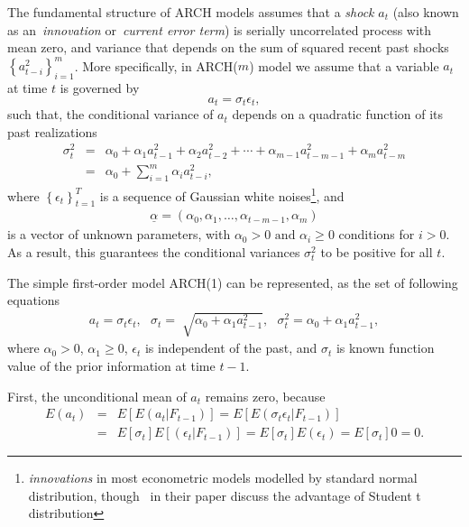 \documentclass[a4paper,11pt,english]{article}
\begin{document}
			The fundamental structure of ARCH models assumes that a \emph{shock} $a_t$ (also known as an~\emph{innovation} or~\emph{current error term}) is 
			serially uncorrelated process with mean zero, and variance that depends on the sum of squared recent past 
			shocks~$\left\{a^2_{t-i} \right\}^m_{i=1}$. More specifically, in ARCH($m$) model we assume that a variable $a_t$ at time $t$ is governed by
			\begin{equation*}
				a_t = \sigma_t \epsilon_t,
			\end{equation*}
			such that, the conditional variance of $a_t$ depends on a quadratic function of its past realizations 
			\begin{eqnarray} \label{eq:quadratic}
				\sigma_t^2 &=&  \alpha_0 + \alpha_1 a^2_{t-1} + \alpha_2 a^2_{t-2} + \cdots + \alpha_{m-1} a^2_{t-m-1}  + \alpha_m a^2_{t-m}  \\
						 &=& \alpha_0 + \sum_{i=1}^{m} \alpha_i a^2_{t-i},
			\end{eqnarray}								
			where $\left\{\epsilon_t \right\}_{t=1}^T$ is a sequence of Gaussian white noises\footnote{\emph{innovations} in most 
			econometric models modelled by standard normal distribution, though~\citep{hamiltonsusmel} in their paper discuss the advantage of Student t 
			distribution}, and 
			\begin{eqnarray*}
			\underline{\alpha} = (\alpha_0, \alpha_1, \ldots, \alpha_{t-m-1}, \alpha_m)
			\end{eqnarray*}
			is a vector of unknown parameters, with $\alpha_0 > 0 \text{ and } \alpha_i\geq 0$ conditions for $i > 0$. As a result, this guarantees the 
			conditional variances $\sigma_t^2$  to be positive for all $t$.~\vspace{0,3cm}	
			
			The simple first-order model ARCH(1) can be represented, as the set of following equations
			\begin{eqnarray} \label{eq:arch1}
			a_t = \sigma_t \epsilon_t, \text{ } \sigma_t = \sqrt[]{\alpha_0 + \alpha_1 a^2_{t-1}}, \text{ }	\sigma_t^2 = \alpha_0 + \alpha_1 a^2_{t-1}, 
			\end{eqnarray}
			where $\alpha_0 > 0$, $\alpha_1 \geq 0$, $\epsilon_t$ is independent of the past, and $\sigma_t$ is known function value of the prior 
			information at time $t-1$.   
			
			First, the unconditional mean of $a_t$ remains zero, because 
			\begin{eqnarray*}
				E(a_t) &=& E\left[ E(a_t | F_{t-1}) \right] = E\left[ E(\sigma_t \epsilon_t | F_{t-1}) \right] \\
				       &=& E\left[ \sigma_t \right] E\left[ (\epsilon_t | F_{t-1}) \right]  = E\left[ \sigma_t \right]  E(\epsilon_t) 
				       = E\left[ \sigma_t \right]  0 = 0.
			\end{eqnarray*}						
			
\end{document}
